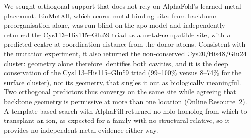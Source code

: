 \documentclass[11pt,a4paper]{article}
\begin{document}
We sought orthogonal support that does not rely on AlphaFold's learned metal placement. BioMetAll, which scores metal-binding sites from backbone preorganisation alone, was run blind on the apo model and independently returned the Cys113--His115--Glu59 triad as a metal-compatible site, with a predicted centre at coordination distance from the donor atoms. Consistent with the mutation experiment, it also returned the non-conserved Cys20/His48/Glu24 cluster: geometry alone therefore identifies both cavities, and it is the deep conservation of the Cys113--His115--Glu59 triad (99--100\% versus 8--74\% for the surface cluster), not its geometry, that singles it out as biologically meaningful. Two orthogonal predictors thus converge on the same site while agreeing that backbone geometry is permissive at more than one location (Online Resource~2). A template-based search with AlphaFill returned no holo homolog from which to transplant an ion, as expected for a family with no structural relative, so it provides no independent metal evidence either way.
\end{document}
